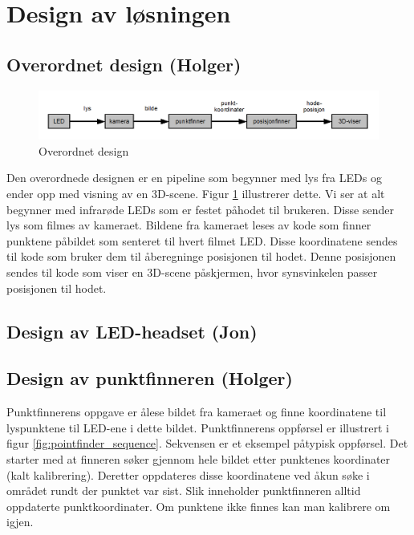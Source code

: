 \section{Design av l\o  sningen}

	\subsection{Overordnet design (Holger)}
	
		\begin{figure}[h]
		\centering
		\includegraphics[width=\textwidth]{graphics/main_design.png}
		\caption{Overordnet design}
		\label{fig:main_design}
		\end{figure}
		
		Den overordnede designen er en pipeline som begynner med lys fra LEDs og ender opp med visning av en 3D-scene. Figur \ref{fig:main_design} illustrerer dette. Vi ser at alt begynner med infrar\o  de LEDs som er festet p\aa \space hodet til brukeren. Disse sender lys som filmes av kameraet. Bildene fra kameraet leses av kode som finner punktene p\aa \space bildet som senteret til hvert filmet LED. Disse koordinatene sendes til kode som bruker dem til \aa \space \space beregninge posisjonen til hodet. Denne posisjonen sendes til kode som viser en 3D-scene p\aa \space skjermen, hvor synsvinkelen passer posisjonen til hodet.
	
	\subsection{Design av LED-headset (Jon)}
	
		
	
	\subsection{Design av punktfinneren (Holger)}
	
		Punktfinnerens oppgave er \aa \space lese bildet fra kameraet og finne koordinatene til lyspunktene til LED-ene i dette bildet. Punktfinnerens oppf\o rsel er illustrert i figur \ref{fig:pointfinder_sequence}. Sekvensen er et eksempel p\aa \space typisk oppf\o rsel. Det starter med at finneren s\o ker gjennom hele bildet etter punktenes koordinater (kalt kalibrering). Deretter oppdateres disse koordinatene ved \aa \space kun s\o ke i omr\aa det rundt der punktet var sist. Slik inneholder punktfinneren alltid oppdaterte punktkoordinater. Om punktene ikke finnes kan man kalibrere om igjen.
		

